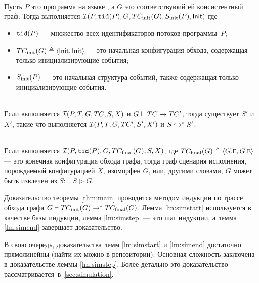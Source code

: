 \begin{lemma}
  \label{lm:simstart}
  \quad\\
  Пусть $P$ это программа на языке \LLANG,
  а $G$ это соответствуюий ей \IMM консистентный граф.
  Тогда выполняется $\mathcal{I}(P, {\mathtt{tid}}(P), G, TC_{\mathrm{init}}({G}), S_{\rm init}(P), {\mathsf{Init}})$ где
  \begin{itemize}
    \item ${\mathtt{tid}}(P)$ --- множество всех идентификаторов потоков программы~$P$;
    \item $TC_{\mathrm{init}}({G}) \triangleq \langle {\mathsf{Init}}, {\mathsf{Init}} \rangle$ --- это начальная конфигурация обхода,
      содержащая только инициализирующие события;
    \item $S_{\rm init}(P)$ --- это начальная структура событий,
      также содержащая только инициализирующие события.
  \end{itemize}
\end{lemma}

\begin{lemma}
  \label{lm:simstep}
  \quad\\
  Если выполняется $\mathcal{I}(P, T, G, TC, S, X)$ и ${G \vdash TC \xrightarrow{} TC'}$,
  тогда существует $S'$ и $X'$, такие что выполняется
  $\mathcal{I}(P, T, G, TC', S', X')$ и $S \xhookrightarrow{}^* S'$.
\end{lemma}

\begin{lemma}
  \label{lm:simend}
  \quad\\
  Если выполняется $\mathcal{I}(P, {\mathtt{tid}}(P), G, TC_{\mathrm{final}}({G}), S, X)$,
  где $TC_{\mathrm{final}}({G}) \triangleq \langle G.{\mathtt{E}}, G.{\mathtt{E}} \rangle$ --- это конечная
  конфигурация обхода графа, тогда граф сценария исполнения,
  порождаемый конфигурацией $X$, изоморфен $G$,
  или, другими словами, $G$ может быть извлечен из $S$:~~$S \rhd G$.
\end{lemma}

Доказательство теоремы \ref{thm:main}
проводится методом индукции по трассе обхода графа
$G \vdash TC_{\mathrm{init}}({G}) \xrightarrow{}^* TC_{\mathrm{final}}({G})$.
Лемма \ref{lm:simstart} используется в качестве базы индукции,
лемма \ref{lm:simstep} --- это шаг индукции,
а лемма \ref{lm:simend} завершает доказательство.

В свою очередь, доказательства лемм \ref{lm:simstart} и \ref{lm:simend}
достаточно прямолинейны (найти их можно в \coq репозитории).
Основная сложность заключена в доказательстве леммы \ref{lm:simstep}.
Более детально это доказательство рассматривается~в~\cref{sec:simulation}.

